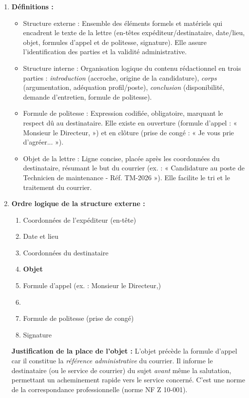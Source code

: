 \documentclass[11pt]{article}
\newcommand{\cle}[1]{{\popxbold\color{popdark}#1}}
\begin{document}
\begin{corrige}
\begin{enumerate}
    \item \textbf{Définitions :}
    \begin{itemize}
        \item \cle{Structure externe} : Ensemble des éléments formels et matériels qui encadrent le texte de la lettre (en-têtes expéditeur/destinataire, date/lieu, objet, formules d'appel et de politesse, signature). Elle assure l'identification des parties et la validité administrative.
        \item \cle{Structure interne} : Organisation logique du contenu rédactionnel en trois parties : \emph{introduction} (accroche, origine de la candidature), \emph{corps} (argumentation, adéquation profil/poste), \emph{conclusion} (disponibilité, demande d'entretien, formule de politesse).
        \item \cle{Formule de politesse} : Expression codifiée, obligatoire, marquant le respect dû au destinataire. Elle existe en ouverture (formule d'appel : « Monsieur le Directeur, ») et en clôture (prise de congé : « Je vous prie d'agréer... »).
        \item \cle{Objet de la lettre} : Ligne concise, placée après les coordonnées du destinataire, résumant le but du courrier (ex. : « Candidature au poste de Technicien de maintenance - Réf. TM-2026 »). Elle facilite le tri et le traitement du courrier.
    \end{itemize}
    \item \textbf{Ordre logique de la structure externe :}
    \begin{enumerate}
        \item Coordonnées de l'expéditeur (en-tête)
        \item Date et lieu
        \item Coordonnées du destinataire
        \item \textbf{Objet}
        \item Formule d'appel (ex. : Monsieur le Directeur,)
        \item [Corps de la lettre : Introduction, Développement, Conclusion]
        \item Formule de politesse (prise de congé)
        \item Signature
    \end{enumerate}
    \textbf{Justification de la place de l'objet :} L'objet précède la formule d'appel car il constitue la \emph{référence administrative} du courrier. Il informe le destinataire (ou le service de courrier) du sujet \emph{avant} même la salutation, permettant un acheminement rapide vers le service concerné. C'est une norme de la correspondance professionnelle (norme NF Z 10-001).
\end{enumerate}
\end{corrige}
\end{document}
